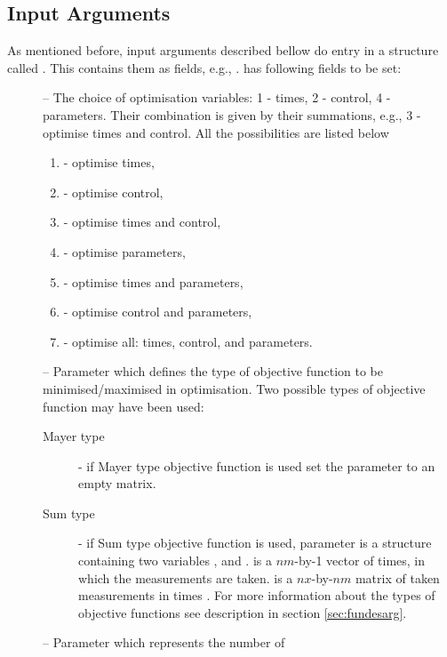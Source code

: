 \subsection{Input Arguments}
\label{sec:inarg}

As mentioned before, input arguments described bellow do entry
 in a structure called . This contains
them as fields, e.g., . 
has following fields to be set: 
\begin{description}
\item[] -- The choice of optimisation variables: 1 -
  times, 2 - control, 4 - parameters. Their combination is given by
  their summations, e.g., 3 - optimise times and control. All the
  possibilities are listed below
  \begin{enumerate}[1]
  \item - optimise times,
  \item - optimise control,
  \item - optimise times and control,
  \item - optimise parameters,
  \item - optimise times and parameters,
  \item - optimise control and parameters,
  \item - optimise all: times, control, and parameters.
  \end{enumerate}
\item[] -- Parameter which defines the type of
  objective function to be minimised/maximised in optimisation. Two
  possible types of objective function may have been used: 
  \begin{description}
  \item[Mayer type] - if Mayer type objective function is used set the
    parameter  to an empty matrix.
  \item[Sum type] - if Sum type objective function is used, parameter
     is a structure containing two variables
    , and .  is a $nm$-by-1 vector of
    times, in which the measurements are taken.  is a
    $nx$-by-$nm$ matrix of taken measurements in times
    . For more information about the types of objective
    functions see  description in section
    \ref{sec:fundesarg}. 
  \end{description}
\item[] -- Parameter which represents the number of

\end{description}
